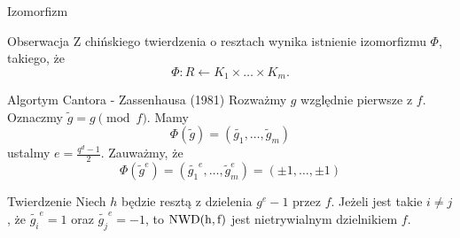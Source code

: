 \documentclass{beamer}
\newcommand{\NWD}{\rm{NWD}}
\begin{document}
\begin{frame}{Izomorfizm}
    \begin{alertblock}{Obserwacja}
    Z chińskiego twierdzenia o resztach wynika istnienie izomorfizmu $\Phi$, takiego, że
    $$ \Phi : R \leftarrow K_1 \times \ldots \times K_m.$$        
    \end{alertblock}
\end{frame}

\begin{frame}{Algortym Cantora - Zassenhausa (1981)}
    Rozważmy $g$ względnie pierwsze z $f$. Oznaczmy $\tilde{g} = g \pmod{f}$.
    Mamy $$ \Phi(\tilde{g}) = (\tilde{g_1}, \ldots, \tilde{g}_m)$$
    ustalmy $e = \frac{q^d - 1}{2}$. Zauważmy, że 
    $$ \Phi(\tilde{g}^e) = (\tilde{g_1}^e, \ldots, \tilde{g}_m^e) = (\pm 1, \ldots , \pm 1)$$
    \pause 
    \begin{block}{Twierdzenie}
        Niech $h$ będzie resztą z dzielenia $g^e -1$ przez $f$. Jeżeli jest takie $i \neq j$,
        że $\tilde{g_i}^e =1$ oraz $\tilde{g_j}^e = -1$, to $\NWD(h,f)$ jest nietrywialnym dzielnikiem $f$.  
    \end{block}
\end{frame}
\end{document}

